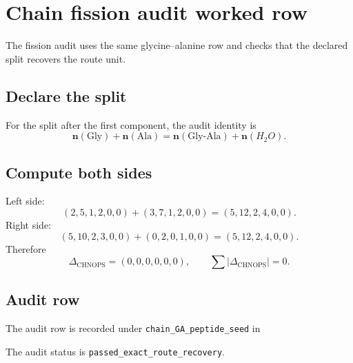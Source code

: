 \section{Chain fission audit worked row}

The fission audit uses the same glycine--alanine row and checks that the declared split recovers the route unit.

\subsection{Declare the split}

For the split after the first component, the audit identity is
\[
\boxed{\mathbf n(\mathrm{Gly})+\mathbf n(\mathrm{Ala})
=
\mathbf n(\mathrm{Gly\mbox{-}Ala})+\mathbf n(H_2O).}
\]

\subsection{Compute both sides}

Left side:
\[
(2,5,1,2,0,0)+(3,7,1,2,0,0)=(5,12,2,4,0,0).
\]
Right side:
\[
(5,10,2,3,0,0)+(0,2,0,1,0,0)=(5,12,2,4,0,0).
\]
Therefore
\[
\Delta_{\mathrm{CHNOPS}}=(0,0,0,0,0,0),
\qquad
\sum |\Delta_{\mathrm{CHNOPS}}|=0.
\]

\subsection{Audit row}

The audit row is recorded under \texttt{chain\_GA\_peptide\_seed} in
\begin{center}
\small{}
\end{center}
The audit status is \texttt{passed\_exact\_route\_recovery}.
